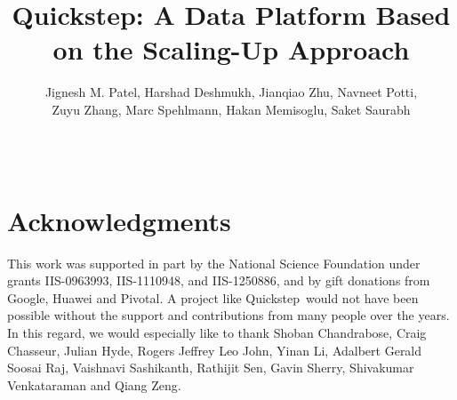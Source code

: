 \documentclass{vldb}
\newcommand{\Quickstep}{Quickstep}
\begin{document}
\title{Quickstep: A Data Platform Based on the Scaling-Up Approach}
\author{
\alignauthor 
 Jignesh M. Patel,
 Harshad Deshmukh,
 Jianqiao Zhu,
 Navneet Potti, \\
 Zuyu Zhang, 
 Marc Spehlmann,
 Hakan Memisoglu, 
 Saket Saurabh \\
\\
\\
}
\date{}
\maketitle












\section{Acknowledgments}
This work was supported in part by the National Science Foundation under grants  IIS-0963993, IIS-1110948, and IIS-1250886, and by gift donations from Google, Huawei and Pivotal. A project like \Quickstep\ would not have been possible without the support and contributions from many people over the years. In this regard, we would especially like to thank Shoban Chandrabose, Craig Chasseur, Julian Hyde, Rogers Jeffrey Leo John, Yinan Li, Adalbert Gerald Soosai Raj, Vaishnavi Sashikanth, Rathijit Sen, Gavin Sherry, Shivakumar Venkataraman and Qiang Zeng.  

\balance

 
\end{document}
